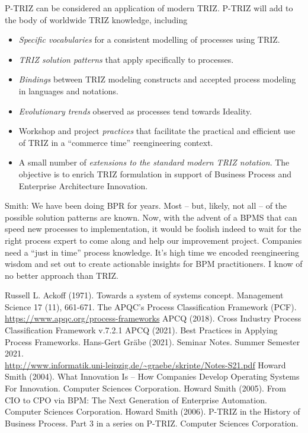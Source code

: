 \documentclass[11pt,a4paper]{article}
\begin{document}
P-TRIZ can be considered an application of modern TRIZ.  P-TRIZ will add to
the body of worldwide TRIZ knowledge, including
\begin{itemize}
\item \emph{Specific vocabularies} for a consistent modelling of processes
  using TRIZ.
\item \emph{TRIZ solution patterns} that apply specifically to processes. 
\item \emph{Bindings} between TRIZ modeling constructs and accepted process
  modeling in languages and notations.
\item \emph{Evolutionary trends} observed as processes tend towards Ideality.
\item Workshop and project \emph{practices} that facilitate the practical and
  efficient use of TRIZ in a “commerce time” reengineering context.
\item A small number of \emph{extensions to the standard modern TRIZ
  notation}.  The objective is to enrich TRIZ formulation in support of
  Business Process and Enterprise Architecture Innovation.
\end{itemize}

Smith: We have been doing BPR for years. Most – but, likely, not all – of the
possible solution patterns are known. Now, with the advent of a BPMS that can
speed new processes to implementation, it would be foolish indeed to wait for
the right process expert to come along and help our improvement project.
Companies need a “just in time” process knowledge. It’s high time we encoded
reengineering wisdom and set out to create actionable insights for BPM
practitioners. I know of no better approach than TRIZ.

\begin{thebibliography}{xxx}
 Russell L. Ackoff (1971). Towards a system of systems
  concept.  Management Science 17 (11), 661-671.
 The APQC’s Process Classification Framework (PCF).\\
  \url{https://www.apqc.org/process-frameworks}
 APCQ (2018). Cross Industry Process Classification Framework
  v.7.2.1
 APCQ (2021). Best Practices in Applying Process Frameworks.
 Hans-Gert Gräbe (2021). Seminar Notes. Summer Semester
  2021.\\
  \url{http://www.informatik.uni-leipzig.de/~graebe/skripte/Notes-S21.pdf} 
 Howard Smith (2004). What Innovation Is – How Companies
  Develop Operating Systems For Innovation. Computer Sciences Corporation. 
 Howard Smith (2005). From CIO to CPO via BPM: The Next
  Generation of Enterprise Automation. Computer Sciences Corporation.
 Howard Smith (2006). P-TRIZ in the History of Business
  Process. Part 3 in a series on P-TRIZ.  Computer Sciences Corporation.
\end{thebibliography}
\end{document}
